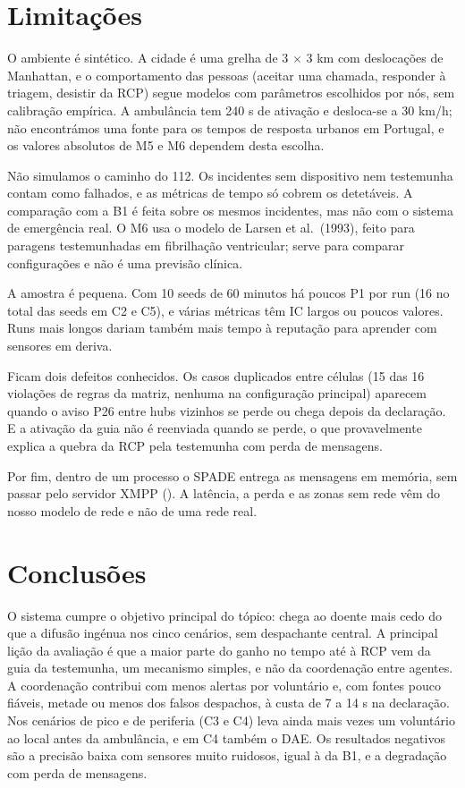 \documentclass[11pt,a4paper]{article}
\begin{document}
\section{Limitações}\label{sec:limitacoes}

O ambiente é sintético. A cidade é uma grelha de 3 $\times$ 3 km com deslocações de Manhattan, e o comportamento das pessoas (aceitar uma chamada, responder à triagem, desistir da RCP) segue modelos com parâmetros escolhidos por nós, sem calibração empírica. A ambulância tem 240 s de ativação e desloca-se a 30 km/h; não encontrámos uma fonte para os tempos de resposta urbanos em Portugal, e os valores absolutos de M5 e M6 dependem desta escolha.

Não simulamos o caminho do 112. Os incidentes sem dispositivo nem testemunha contam como falhados, e as métricas de tempo só cobrem os detetáveis. A comparação com a B1 é feita sobre os mesmos incidentes, mas não com o sistema de emergência real. O M6 usa o modelo de Larsen et al.\ (1993), feito para paragens testemunhadas em fibrilhação ventricular; serve para comparar configurações e não é uma previsão clínica.

A amostra é pequena. Com 10 seeds de 60 minutos há poucos P1 por run (16 no total das seeds em C2 e C5), e várias métricas têm IC largos ou poucos valores. Runs mais longos dariam também mais tempo à reputação para aprender com sensores em deriva.

Ficam dois defeitos conhecidos. Os casos duplicados entre células (15 das 16 violações de regras da matriz, nenhuma na configuração principal) aparecem quando o aviso P26 entre hubs vizinhos se perde ou chega depois da declaração. E a ativação da guia não é reenviada quando se perde, o que provavelmente explica a quebra da RCP pela testemunha com perda de mensagens.

Por fim, dentro de um processo o SPADE entrega as mensagens em memória, sem passar pelo servidor XMPP (). A latência, a perda e as zonas sem rede vêm do nosso modelo de rede e não de uma rede real.

\section{Conclusões}\label{sec:conclusoes}

O sistema cumpre o objetivo principal do tópico: chega ao doente mais cedo do que a difusão ingénua nos cinco cenários, sem despachante central. A principal lição da avaliação é que a maior parte do ganho no tempo até à RCP vem da guia da testemunha, um mecanismo simples, e não da coordenação entre agentes. A coordenação contribui com menos alertas por voluntário e, com fontes pouco fiáveis, metade ou menos dos falsos despachos, à custa de 7 a 14 s na declaração. Nos cenários de pico e de periferia (C3 e C4) leva ainda mais vezes um voluntário ao local antes da ambulância, e em C4 também o DAE. Os resultados negativos são a precisão baixa com sensores muito ruidosos, igual à da B1, e a degradação com perda de mensagens.
\end{document}
